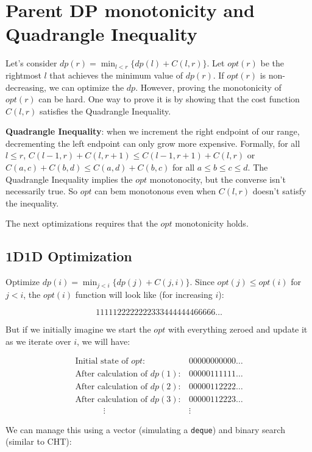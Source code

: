 \section{Parent DP monotonicity and Quadrangle Inequality}

Let's consider $dp(r) = \min_{l<r}\{dp(l) + C(l,r)\}$. Let $opt(r)$ be the rightmost $l$ that achieves the minimum value of $dp(r)$. If $opt(r)$ is non-decreasing, we can optimize the $dp$. However, proving the monotonicity of $opt(r)$ can be hard. One way to prove it is by showing that the cost function $C(l,r)$ satisfies the Quadrangle Inequality.

\textbf{Quadrangle Inequality}: when we increment the right endpoint of our range, decrementing the left endpoint can only grow more expensive. Formally, for all $l \leq r$, $C(l - 1, r)+ C(l, r + 1) \leq C(l - 1, r + 1) + C(l, r)$ or $C(a, c) + C(b, d) \leq C(a, d) + C(b, c)$ for all $a \le b \le c \le d$. The Quadrangle Inequality implies the $opt$ monotonocity, but the converse isn't necessarily true. So $opt$ can bem monotonous even when $C(l,r)$ doesn't satisfy the inequality.

The next optimizations requires that the $opt$ monotonicity holds.

\subsection{1D1D Optimization}

Optimize $dp(i) = \min_{j < i}\{dp(j) + C(j,i)\}$. Since $opt(j) \leq opt(i)$ for $j < i$, the $opt(i)$ function will look like (for increasing $i$):

\[
1111122222222333444444466666\dots
\]

But if we initially imagine we start the $opt$ with everything zeroed and update it as we iterate over $i$, we will have:

\[
\begin{array}{lc}
\text{Initial state of } opt:      & 00000000000\dots \\
\text{After calculation of }dp(1): & 00000111111\dots \\
\text{After calculation of }dp(2): & 00000112222\dots \\
\text{After calculation of }dp(3): &00000112223\dots \\
~~~~~~~~~~~~~~~\vdots              & \vdots
\end{array}
\]

We can manage this using a vector (simulating a \texttt{deque}) and binary search (similar to CHT):

